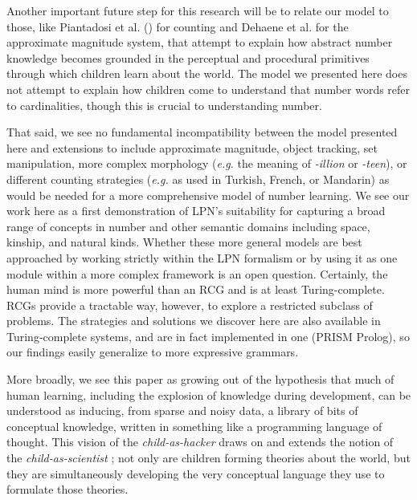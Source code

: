 \documentclass[10pt,letterpaper]{article}
\begin{document}
Another important future step for this research will be to relate our
model to those, like Piantadosi et al. (\citeyear{PianGoodTen2012})
for counting and Dehaene et al. for the approximate magnitude system,
that attempt to explain how abstract number knowledge becomes grounded
in the perceptual and procedural primitives through which children
learn about the world. The model we presented here does not attempt to
explain how children come to understand that number words refer to
cardinalities, though this is crucial to understanding number.

That said, we see no fundamental incompatibility between the model
presented here and extensions to include approximate magnitude, object
tracking, set manipulation, more complex morphology ({\it e.g.} the
meaning of \emph{-illion} or \emph{-teen}), or different counting
strategies ({\it e.g.} as used in Turkish, French, or Mandarin) as
would be needed for a more comprehensive model of number learning. We
see our work here as a first demonstration of LPN's suitability for
capturing a broad range of concepts in number and other semantic
domains including space, kinship, and natural kinds.  Whether these
more general models are best approached by working strictly within the
LPN formalism or by using it as one module within a more complex
framework is an open question. Certainly, the human mind is more
powerful than an RCG and is at least Turing-complete.  RCGs provide a
tractable way, however, to explore a restricted subclass of
problems. The strategies and solutions we discover here are also
available in Turing-complete systems, and are in fact implemented in
one (PRISM Prolog), so our findings easily generalize to more
expressive grammars.

More broadly, we see this paper as growing out of the hypothesis that
much of human learning, including the explosion of knowledge during
development, can be understood as inducing, from sparse and noisy data,
a library of bits of conceptual knowledge, written in something like a
programming language of thought. This vision of the
\emph{child-as-hacker} draws on and extends the notion of the
\emph{child-as-scientist} \citep{gopnik1996scientist}; not only are
children forming theories about the world, but they are simultaneously
developing the very conceptual language they use to formulate those
theories.





\setlength{\bibleftmargin}{.125in}
\setlength{\bibindent}{-\bibleftmargin}

\end{document}

